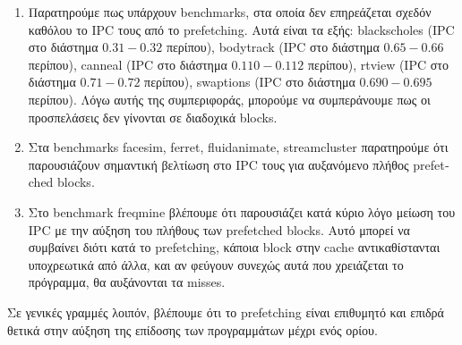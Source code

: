 \begin{enumerate}
    \item Παρατηρούμε πως υπάρχουν \textlatin{benchmarks}, στα οποία δεν
    επηρεάζεται σχεδόν καθόλου το \textlatin{IPC} τους από το
    \textlatin{prefetching}. Αυτά είναι τα εξής: \textlatin{blackscholes (IPC}
    στο διάστημα $0.31-0.32$ περίπου), \textlatin{bodytrack (IPC} στο διάστημα
    $0.65-0.66$ περίπου), \textlatin{canneal (IPC} στο διάστημα $0.110-0.112$
    περίπου), \textlatin{rtview (IPC} στο διάστημα $0.71-0.72$ περίπου),
    \textlatin{swaptions (IPC} στο διάστημα $0.690-0.695$ περίπου). Λόγω αυτής
    της συμπεριφοράς, μπορούμε να συμπεράνουμε πως οι προσπελάσεις δεν γίνονται
    σε διαδοχικά \textlatin{blocks}.
    
    \item Στα \textlatin{benchmarks facesim, ferret, fluidanimate,
    streamcluster}  παρατηρούμε ότι παρουσιάζουν σημαντική βελτίωση στο
    \textlatin{IPC} τους για αυξανόμενο πλήθος \textlatin{prefetched blocks}.
    
    \item Στο \textlatin{benchmark freqmine} βλέπουμε ότι παρουσιάζει κατά κύριο
    λόγο μείωση του \textlatin{IPC} με την αύξηση του πλήθους των
    \textlatin{prefetched blocks}. Αυτό μπορεί να συμβαίνει διότι κατά το
    \textlatin{prefetching}, κάποια \textlatin{block} στην \textlatin{cache}
    αντικαθίστανται υποχρεωτικά από άλλα, και αν φεύγουν συνεχώς αυτά που
    χρειάζεται το πρόγραμμα, θα αυξάνονται τα \textlatin{misses}.

\end{enumerate}

Σε γενικές γραμμές λοιπόν, βλέπουμε ότι το \textlatin{prefetching} είναι
επιθυμητό και επιδρά θετικά στην αύξηση της επίδοσης των προγραμμάτων μέχρι ενός ορίου.\vspace{1cm}
